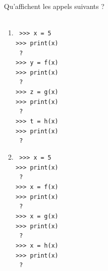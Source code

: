 {\begin{td}
Qu'affichent les appels suivants ?\\
\mbox{}\\
\begin{minipage}{3.5cm}
\begin{enumerate}
\item 
\begin{py}{2.5cm}\tt
>{>}> x = 5\\
>{>}> print(x)\\
{\color{red} ?}\\
>{>}> y = f(x)\\
>{>}> print(x)\\
{\color{red} ?}\\
>{>}> z = g(x)\\
>{>}> print(x)\\
{\color{red} ?}\\
>{>}> t = h(x)\\
>{>}> print(x)\\
{\color{red} ?}
\end{py}
\end{enumerate}
\end{minipage}
\hfill
\begin{minipage}{3.5cm}
\begin{enumerate}\setcounter{enumi}{1}
\item 
\begin{py}{2.5cm}\tt
>{>}> x = 5\\
>{>}> print(x)\\
{\color{red} ?}\\
>{>}> x = f(x)\\
>{>}> print(x)\\
{\color{red} ?}\\
>{>}> x = g(x)\\
>{>}> print(x)\\
{\color{red} ?}\\
>{>}> x = h(x)\\
>{>}> print(x)\\
{\color{red} ?}
\end{py}
\end{enumerate}
\end{minipage}
\end{td}
}


